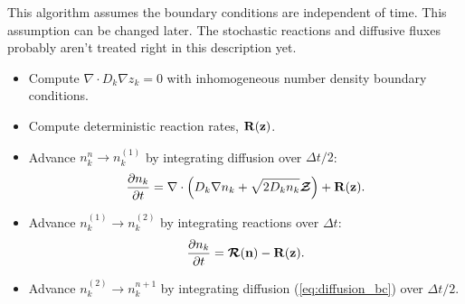 \documentclass[final]{siamltex}
\def\nb  {{\bf n}}
\def\Rb  {{\bf R}}
\def\zb  {{\bf z}}
\def\mRb {\bm{\mathcal{R}}}
\def\mZb {\bm{\mathcal{Z}}}
\begin{document}
This algorithm assumes the boundary conditions are independent of time.  This
assumption can be changed later.  The stochastic reactions and diffusive fluxes
probably aren't treated right in this description yet.

\begin{itemize}
\item Compute $\nabla\cdot D_k\nabla z_k = 0$ with inhomogeneous number density boundary
conditions.

\item Compute deterministic reaction rates, $\Rb(\zb)$.

\item Advance $n_k^n \rightarrow n_k^{(1)}$ by integrating diffusion over $\Delta t/2$:
\begin{equation}
\frac{\partial n_k}{\partial t} = \nabla\cdot\left(D_k\nabla n_k + \sqrt{2D_kn_k}\mZb\right) + \Rb(\zb).\label{eq:diffusion_bc}
\end{equation}

\item Advance $ n_k^{(1)} \rightarrow  n_k^{(2)}$ by integrating 
reactions over $\Delta t$:
\begin{equation}
\frac{\partial n_k}{\partial t} = \mRb(\nb) - \Rb(\zb).
\end{equation}

\item Advance $ n_k^{(2)} \rightarrow  n_k^{n+1}$ by integrating 
diffusion (\ref{eq:diffusion_bc}) over $\Delta t/2$.

\end{itemize}



\end{document}
